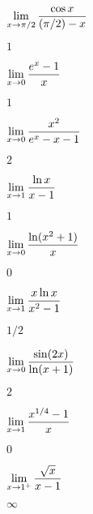 \begin{exercises}
\begin{exercise} $\displaystyle\lim_{x\to\pi/2}{\cos x\over (\pi/2)-x}$
\begin{answer} $1$
\end{answer}\end{exercise}

\begin{exercise} $\displaystyle\lim_{x\to0}{e^x-1\over x}$
\begin{answer} $1$
\end{answer}\end{exercise}

\begin{exercise} $\displaystyle\lim_{x\to0}{x^2\over e^x-x-1}$
\begin{answer} $2$
\end{answer}\end{exercise}

\begin{exercise} $\displaystyle\lim_{x\to1}{\ln x\over x-1}$
\begin{answer} $1$
\end{answer}\end{exercise}

\begin{exercise} $\displaystyle\lim_{x\to0}{\ln(x^2+1)\over x}$
\begin{answer} $0$
\end{answer}\end{exercise}

\begin{exercise} $\displaystyle\lim_{x\to1}{x\ln x\over x^2-1}$
\begin{answer} $1/2$
\end{answer}\end{exercise}

\begin{exercise} $\displaystyle\lim_{x\to0}{\sin(2x)\over\ln(x+1)}$
\begin{answer} $2$
\end{answer}\end{exercise}

\begin{exercise} $\displaystyle\lim_{x\to1}{x^{1/4}-1\over x}$
\begin{answer} $0$
\end{answer}\end{exercise}

\begin{exercise} $\displaystyle\lim_{x\to1^+}{\sqrt{x}\over x-1}$
\begin{answer} $\infty$
\end{answer}\end{exercise}


\end{exercises}
